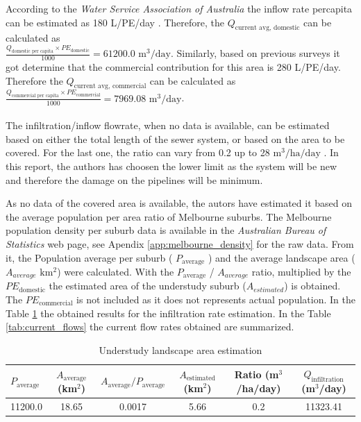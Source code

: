 \documentclass[12pt]{article}
\begin{document}
According to the \textit{Water Service Association of Australia} the inflow rate percapita
can be estimated as 
180
L/PE/day \cite{yarravalleywater_2023_amf}. Therefore, the 
\( Q_{\text{current avg, domestic}} \) can be calculated as\\
\(\frac{Q_{\text{domestic per capita}} \times PE_{\text{domestic}}}{1000}= 61200.0\)
\(\mathrm{m^3/day}\).
Similarly, based on previous surveys it got determine that the commercial contribution for this area is
280 L/PE/day. Therefore the 
\( Q_{\text{current avg, commercial}} \) can be calculated as
\(\frac{Q_{\text{commercial per capita}} \times PE_{\text{commercial}}}{1000}= 7969.08\)
\(\mathrm{m^3/day}\).\\
\\
The infiltration/inflow flowrate, when no data is available, can be estimated based on either the
total length of the sewer system, or based on the area to be covered. For the last one, the ratio can vary
from 0.2 up to 28 \(\mathrm{m^3/ha/day}\) \cite{metcalf_2014_wastewater}. In this report, the authors
has choosen the lower limit as the system will be new and therefore the damage on the pipelines will be
minimum. 

As no data of the covered area is available, the autors have estimated it based on the average
population per area ratio of Melbourne suburbs. The Melbourne population density per suburb data is available in the 
\textit{Australian Bureau of Statistics} web page, see Apendix  \ref{app:melbourne_density} for the raw data.
From it, the Population average per suburb ( \(P_{\text{average}}\) ) and the average landscape area (\(A_{average}\) \(\mathrm{km^2}\))
were calculated. With the \(P_{\text{average}}\) / \(A_{average}\) ratio, multiplied by the \(PE_{\mathrm{domestic}}\)
the estimated area of the understudy suburb (\(A_{estimated}\)) is obtained. The \(PE_{\mathrm{commercial}}\) is not included
as it does not represents actual population. In the Table \ref{tab:und_study_area} the obtained results for the infiltration 
rate estimation. In the Table \ref{tab:current_flows} the current flow rates obtained are summarized.\\

\begin{table}[h]
  \centering
  \begin{tabular}{|p{2cm}|c|c|c|c|c|}
  \hline
  $P_{\text{average}}$ & $A_{\text{average}}$ (km$^2$) & $A_{\text{average}} / P_{\text{average}}$ & $A_{\text{estimated}}$ (km$^2$) & Ratio (m$^3$/ha/day) & $Q_{\text{infiltration}}$ (m$^3$/day) \\
  \hline
  11200.0 & 18.65 & 0.0017 & 5.66 & 0.2 & 11323.41 \\
  \hline
  \end{tabular}
  \caption{Understudy landscape area estimation}
  \label{tab:und_study_area}
\end{table}
\end{document}
